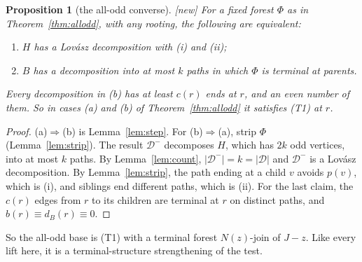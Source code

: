 \documentclass[11pt]{amsart}
\newtheorem{proposition}[theorem]{Proposition}
\theoremstyle{definition}
\newcommand{\st}[1]{\textsf{\small[#1]}}
\newcommand{\cD}{\mathcal D}
\begin{document}
\begin{proposition}[the all-odd converse]\label{prop:alloddconv} \st{new}
For a fixed forest $\Phi$ as in Theorem~\ref{thm:allodd}, with any rooting, the following are
equivalent:
\begin{enumerate}[label=(\alph*)]
\item $H$ has a Lov\'asz decomposition with (i) and (ii);
\item $B$ has a decomposition into at most $k$ paths in which $\Phi$ is terminal at parents.
\end{enumerate}
Every decomposition in (b) has at least $c(r)$ ends at $r$, and an even number of them. So in cases (a)
and (b) of Theorem~\ref{thm:allodd} it satisfies (T1) at $r$.
\end{proposition}

\begin{proof}
(a)$\Rightarrow$(b) is Lemma~\ref{lem:step}. For (b)$\Rightarrow$(a), strip $\Phi$
(Lemma~\ref{lem:strip}). The result $\cD^-$ decomposes $H$, which has $2k$ odd vertices, into at most
$k$ paths. By Lemma~\ref{lem:count}, $|\cD^-|=k=|\cD|$ and $\cD^-$ is a Lov\'asz decomposition. By
Lemma~\ref{lem:strip}, the path ending at a child $v$ avoids $p(v)$, which is (i), and siblings end
different paths, which is (ii). For the last claim, the $c(r)$ edges from $r$ to its children are
terminal at $r$ on distinct paths, and $b(r)\equiv d_B(r)\equiv0$.
\end{proof}

So the all-odd base is (T1) with a terminal forest $N(z)$-join of $J-z$. Like every lift here, it is a
terminal-structure strengthening of the test.
\end{document}
